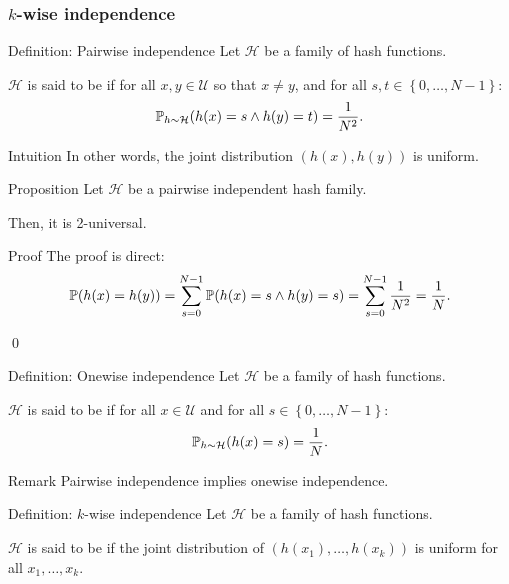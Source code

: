 \documentclass[a4paper]{article}
\begin{document}
\subsubsection{$k$-wise independence}

\begin{parag}{Definition: Pairwise independence}
    Let $\mathcal{H}$ be a family of hash functions.

    $\mathcal{H}$ is said to be  if for all $x, y \in \mathcal{U}$ so that $x \neq y$, and for all $s, t \in \left\{0, \ldots, N-1\right\}$: 
    \[\prob_{h \followsdistr \mathcal{H}}\left(h\left(x\right) = s \land h\left(y\right) = t\right) = \frac{1}{N^2}.\]

    \begin{subparag}{Intuition}
        In other words, the joint distribution $\left(h\left(x\right), h\left(y\right)\right)$ is uniform.
    \end{subparag}
\end{parag}

\begin{parag}{Proposition}
    Let $\mathcal{H}$ be a pairwise independent hash family. 

    Then, it is 2-universal.

    \begin{subparag}{Proof}
        The proof is direct:
        \[\prob\left(h\left(x\right) = h\left(y\right)\right) = \sum_{s = 0}^{N-1} \prob\left(h\left(x\right) = s \land h\left(y\right) = s\right) = \sum_{s = 0}^{N - 1} \frac{1}{N^2} = \frac{1}{N}.\]

        \qed
    \end{subparag}
\end{parag}

\begin{parag}{Definition: Onewise independence}
    Let $\mathcal{H}$ be a family of hash functions.

    $\mathcal{H}$ is said to be  if for all $x \in \mathcal{U}$ and for all $s \in \left\{0, \ldots, N-1\right\}$: 
    \[\prob_{h \followsdistr \mathcal{H}}\left(h\left(x\right) = s\right) = \frac{1}{N}.\]

    \begin{subparag}{Remark}
        Pairwise independence implies onewise independence.
    \end{subparag}
\end{parag}

\begin{parag}{Definition: $k$-wise independence}
    Let $\mathcal{H}$ be a family of hash functions.

    $\mathcal{H}$ is said to be  if the joint distribution of $\left(h\left(x_1\right), \ldots, h\left(x_k\right)\right)$ is uniform for all $x_1, \ldots, x_k$.
\end{parag}
\end{document}
